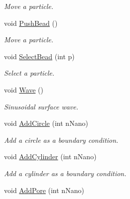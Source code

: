\begin{DoxyCompactItemize}
\begin{DoxyCompactList}\small\item\em Move a particle. \end{DoxyCompactList}\item 
void \hyperlink{classForces_af92f2e6f00fbbe4093f47b78b91eb2e0}{Push\+Bead} ()\hypertarget{classForces_af92f2e6f00fbbe4093f47b78b91eb2e0}{}\label{classForces_af92f2e6f00fbbe4093f47b78b91eb2e0}

\begin{DoxyCompactList}\small\item\em Move a particle. \end{DoxyCompactList}\item 
void \hyperlink{classForces_ad4ff146c379b2d2fa7ea219aae0c124e}{Select\+Bead} (int p)\hypertarget{classForces_ad4ff146c379b2d2fa7ea219aae0c124e}{}\label{classForces_ad4ff146c379b2d2fa7ea219aae0c124e}

\begin{DoxyCompactList}\small\item\em Select a particle. \end{DoxyCompactList}\item 
void \hyperlink{classForces_aea3ac235b677278906db133f4cfd54f4}{Wave} ()\hypertarget{classForces_aea3ac235b677278906db133f4cfd54f4}{}\label{classForces_aea3ac235b677278906db133f4cfd54f4}

\begin{DoxyCompactList}\small\item\em Sinusoidal surface wave. \end{DoxyCompactList}\item 
void \hyperlink{classForces_a3f2b57f5a0d64d4e41d00c90f0600717}{Add\+Circle} (int n\+Nano)\hypertarget{classForces_a3f2b57f5a0d64d4e41d00c90f0600717}{}\label{classForces_a3f2b57f5a0d64d4e41d00c90f0600717}

\begin{DoxyCompactList}\small\item\em Add a circle as a boundary condition. \end{DoxyCompactList}\item 
void \hyperlink{classForces_ad955b144c055a67de0e854e33894ed94}{Add\+Cylinder} (int n\+Nano)\hypertarget{classForces_ad955b144c055a67de0e854e33894ed94}{}\label{classForces_ad955b144c055a67de0e854e33894ed94}

\begin{DoxyCompactList}\small\item\em Add a cylinder as a boundary condition. \end{DoxyCompactList}\item 
void \hyperlink{classForces_a7689eeac5fe56921d52790bcf6344d1f}{Add\+Pore} (int n\+Nano)\hypertarget{classForces_a7689eeac5fe56921d52790bcf6344d1f}{}\label{classForces_a7689eeac5fe56921d52790bcf6344d1f}


\end{DoxyCompactItemize}
